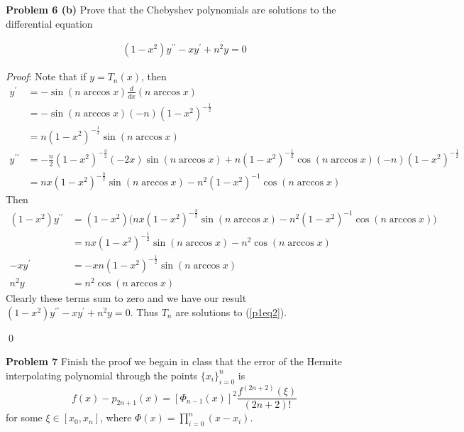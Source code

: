 \documentclass[12pt]{article}
\newcommand{\problem}[1]{\hspace{-4 ex} \large \textbf{Problem #1} }
\renewenvironment{proof}{\hspace{-4 ex} \emph{Proof}:}{\qed}
\begin{document}
\problem{6 (b)} Prove that the Chebyshev polynomials are solutions to the differential equation
	
	\begin{align}\label{p1eq2}
	(1-x^2)y^{\prime\prime}-xy^\prime+n^2y=0
	\end{align}
	
	\begin{proof}
		Note that if $y = T_n(x)$, then
		\begin{align*}
		y^\prime & = -\sin{(n \arccos{x})} \tfrac{d}{dx}(n \arccos{x}) \\
		& = -\sin{(n \arccos{x})} (-n)(1-x^2)^{-\frac{1}{2}} \\
		& = n(1-x^2)^{-\frac{1}{2}}\sin{(n \arccos{x})}  \\
		y^{\prime\prime} &= -\tfrac{n}{2}(1-x^2)^{-\frac{3}{2}}(-2x)\sin{(n \arccos{x})} + n(1-x^2)^{-\frac{1}{2}}\cos{(n \arccos{x})}(-n)(1-x^2)^{-\frac{1}{2}} \\
		&= nx(1-x^2)^{-\frac{3}{2}}\sin{(n \arccos{x})} - n^2(1-x^2)^{-1}\cos{(n\arccos{x})}
		\end{align*}
		Then 
		\begin{align*}
		(1-x^2)y^{\prime\prime} & = (1-x^2) \Big( nx(1-x^2)^{-\frac{3}{2}}\sin{(n \arccos{x})} - n^2(1-x^2)^{-1}\cos{(n\arccos{x})} \Big) \\
		& = nx(1-x^2)^{-\frac{1}{2}}\sin{(n \arccos{x})} - n^2\cos{(n\arccos{x})} \\
		-xy^\prime & = -x n(1-x^2)^{-\frac{1}{2}}\sin{(n \arccos{x})} \\
		n^2y & = n^2\cos{(n \arccos{x})}
		\end{align*}
		Clearly these terms sum to zero and we have our result $(1-x^2)y^{\prime\prime}-xy^\prime+n^2y=0$. Thus $T_n$ are solutions to (\ref{p1eq2}).
		
	\end{proof}

\problem{7} Finish the proof we begain in class that the error of the Hermite interpolating polynomial through the points $\{x_i\}_{i=0}^n$ is 
$$
f(x) - p_{2n+1}(x) = [\Phi_{n-1}(x)]^2 \frac{f^{(2n+2)}(\xi)}{(2n+2)!}
$$
for some $\xi \in [x_0, x_n]$, where $\Phi(x) = \prod\limits_{i=0}^n(x-x_i)$.
\end{document}
